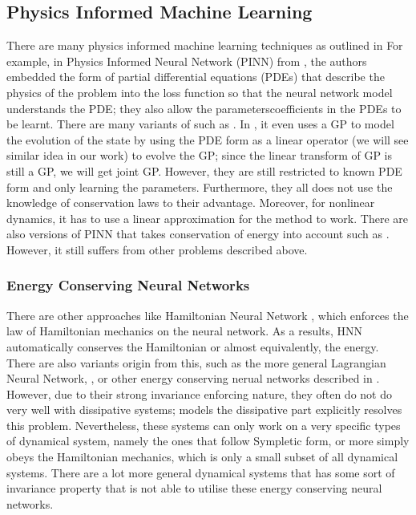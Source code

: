 \documentclass{statsmsc}
\begin{document}
\subsection{Physics Informed Machine Learning}
There are many physics informed machine learning techniques as outlined in \cite{Cuomo2022, PIML}
For example, in Physics Informed Neural Network (PINN) from \cite{Raissi2019}, the authors embedded the form of partial differential equations (PDEs) that describe the physics of the problem into the loss function so that the neural network model understands the PDE; they also allow the parameters\/coefficients in the PDEs to be learnt. 
There are many variants of such as \cite{Qian2020}.
In \cite{Raissi2018}, it even uses a GP to model the evolution of the state by using the PDE form as a linear operator (we will see similar idea in our work) to evolve the GP; since the linear transform of GP is still a GP, we will get joint GP.
However, they are still restricted to known PDE form and only learning the parameters. 
Furthermore, they all does not use the knowledge of conservation laws to their advantage.
Moreover, for nonlinear dynamics, it has to use a linear approximation for the method to work.
There are also versions of PINN that takes conservation of energy into account such as \cite{Jagtap2020}.
However, it still suffers from other problems described above.

\subsubsection{Energy Conserving Neural Networks}
There are other approaches like Hamiltonian Neural Network \cite{HNN}, which enforces the law of Hamiltonian mechanics on the neural network.
As a results, HNN automatically conserves the Hamiltonian or almost equivalently, the energy.
There are also variants origin from this, such as the more general Lagrangian Neural Network, \cite{Cranmer2020}, or other energy conserving nerual networks described in \cite{Zhong2021}.
However, due to their strong invariance enforcing nature, they often do not do very well with dissipative systems; 
\cite{DissipativeHNN} models the dissipative part explicitly resolves this problem.
Nevertheless, these systems can only work on a very specific types of dynamical system, namely the ones that follow Sympletic form, or more simply obeys the Hamiltonian mechanics, which is only a small subset of all dynamical systems.
There are a lot more general dynamical systems that has some sort of invariance property that is not able to utilise these energy conserving neural networks.
\end{document}

